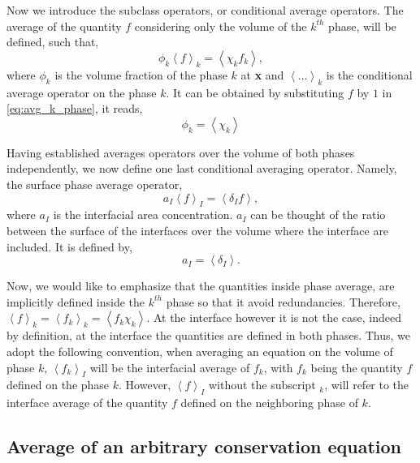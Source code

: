 \documentclass[twocolumn]{My_article}
\newcommand{\avg}[1]{\left<#1\right>}
\newcommand{\kavg}[1]{\left<#1\right>_k}
\newcommand{\Iavg}[1]{\left<#1\right>_I}
\begin{document}
Now we introduce the subclass operators, or conditional average operators.
The average of the quantity $f$ considering only the volume of the $k^{th}$ phase, will be defined, such that,
\begin{equation}
    \phi_k \kavg{f}
    = \avg{\chi_k f_k},
    \label{eq:avg_k_phase}
\end{equation}
where $\phi_k$ is the volume fraction of the phase $k$ at \textbf{x} and $\kavg{\ldots}$ is the conditional average operator on the phase $k$.
It can be obtained by substituting $f$ by $1$ in \ref{eq:avg_k_phase}, it reads,
\begin{equation*}
    \phi_k
    = \avg{\chi_k}
\end{equation*}

Having established averages operators over the volume of both phases independently, we now define one last conditional averaging operator.
Namely, the surface phase average operator,
\begin{equation}
    a_I\Iavg{f}
    = \avg{\delta_I f},
    \label{eq:avg_I_phase}
\end{equation}
where $a_I$ is the interfacial area concentration.
$a_I$ can be thought of the ratio between the surface of the interfaces over the volume where the interface are included.
It is defined by,
\begin{equation}
    a_I
    = \avg{\delta_I}.
\end{equation}

Now, we would like to emphasize that the quantities inside phase average, are implicitly defined inside the $k^{th}$ phase so that it avoid redundancies.
Therefore, $\kavg{f} = \kavg{f_k}= \avg{f_k\chi_k}$.
At the interface however it is not the case, indeed by definition, at the interface the quantities are defined in both phases.
Thus, we adopt the following convention, when averaging an equation on the volume of phase $k$, $\Iavg{f_k}$ will be the interfacial average of $f_k$, with $f_k$ being the quantity $f$ defined on the phase $k$.
However, $\Iavg{f}$ without the subscript $_k$, will refer to the interface average of the quantity $f$ defined on the neighboring phase of $k$.


\subsection{Average of an arbitrary conservation equation}
\end{document}
